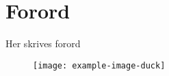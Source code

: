 \chapter*{Forord}\label{Forord}
Her skrives forord

\begin{figure}[H]
    \centering
    \texttt{[image: example-image-duck]}
\end{figure}